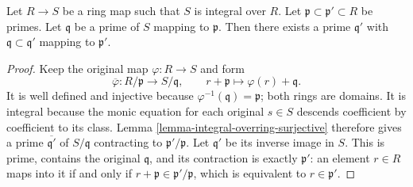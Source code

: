 \begin{lemma}
\label{lemma-integral-going-up}
Let $R \to S$ be a ring map such that
$S$ is integral over $R$.
Let $\mathfrak p \subset \mathfrak p' \subset R$
be primes. Let $\mathfrak q$ be a prime of $S$ mapping
to $\mathfrak p$. Then there exists a prime $\mathfrak q'$
with $\mathfrak q \subset \mathfrak q'$
mapping to $\mathfrak p'$.
\end{lemma}

\begin{proof}
Keep the original map $\varphi:R\to S$ and form
$$
\overline\varphi:R/\mathfrak p\longrightarrow S/\mathfrak q,
\qquad r+\mathfrak p\longmapsto\varphi(r)+\mathfrak q.
$$
It is well defined and injective because
$\varphi^{-1}(\mathfrak q)=\mathfrak p$; both rings are domains.
It is integral because the monic equation for each original
$s\in S$ descends coefficient by coefficient to its class.
Lemma \ref{lemma-integral-overring-surjective} therefore gives
a prime $\overline{\mathfrak q'}$ of $S/\mathfrak q$ contracting
to $\mathfrak p'/\mathfrak p$. Let $\mathfrak q'$ be its inverse
image in $S$. This is prime, contains the original $\mathfrak q$,
and its contraction is exactly $\mathfrak p'$: an element $r\in R$
maps into it if and only if $r+\mathfrak p\in\mathfrak p'/\mathfrak p$,
which is equivalent to $r\in\mathfrak p'$.
\end{proof}